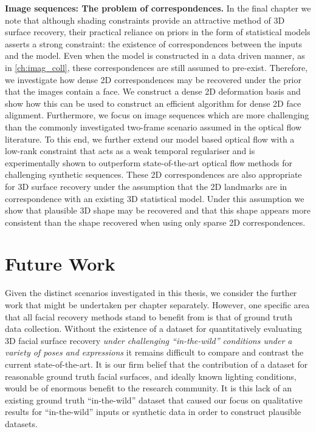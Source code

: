 \textbf{Image sequences: The problem of correspondences.}
In the final chapter we note that although shading constraints provide an
attractive method of 3D surface recovery, their practical reliance on
priors in the form of statistical models asserts a strong constraint: the
existence of correspondences between the inputs and the model. Even when the
model is constructed in a data driven manner, as in \cref{ch:imag_coll},
these correspondences are still assumed to pre-exist. Therefore, we investigate
how dense 2D correspondences may be recovered under the prior that the images
contain a face. We construct a dense 2D deformation basis and show how this can
be used to construct an efficient algorithm for dense 2D face alignment.
Furthermore, we focus on image sequences which are more challenging than the
commonly investigated two-frame scenario assumed in the optical flow literature.
To this end, we further extend our model based optical flow with a low-rank
constraint that acts as a weak temporal regulariser and is experimentally shown
to outperform state-of-the-art optical flow methods for challenging synthetic
sequences. These 2D correspondences are also appropriate for 3D surface recovery
under the assumption that the 2D landmarks are in correspondence with an
existing 3D statistical model. Under this assumption we show that plausible
3D shape may be recovered and that this shape appears more consistent than
the shape recovered when using only sparse 2D correspondences.
\section{Future Work}
Given the distinct scenarios investigated in this thesis, we consider
the further work that might be undertaken per chapter separately. However,
one specific area that all facial recovery methods stand to benefit from
is that of ground truth data collection. Without the existence of a dataset
for quantitatively evaluating 3D facial surface recovery \textit{under
challenging ``in-the-wild'' conditions under a variety of poses and expressions}
it remains difficult to compare and contrast the current state-of-the-art.
It is our firm belief that the contribution of a dataset for reasonable
ground truth facial surfaces, and ideally known lighting conditions, would
be of enormous benefit to the research community. It is this lack of an existing
ground truth ``in-the-wild'' dataset that caused our focus on qualitative
results for ``in-the-wild'' inputs or synthetic data in order to construct
plausible datasets.
